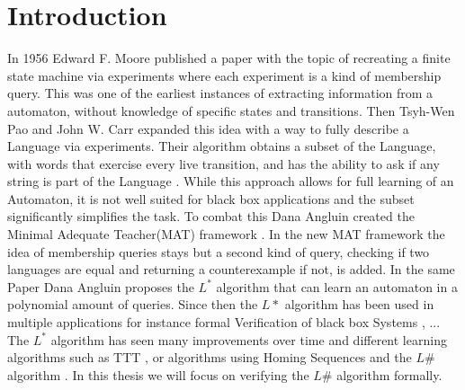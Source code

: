 \chapter{Introduction}
In 1956 Edward F. Moore published a paper with the topic of recreating a finite state machine via experiments\cite{gedankenexperiment} where each experiment is a kind of membership query. This was one of the earliest instances of extracting information from a automaton, without knowledge of specific states and transitions. Then Tsyh-Wen Pao and John W. Carr expanded this idea with a way to fully describe a Language via experiments. Their algorithm obtains a subset of the Language, with words that exercise every live transition, and has the ability to ask if any string is part of the Language \cite{PAO197853}. While this approach allows for full learning of an Automaton, it is not well suited for black box applications and the subset significantly simplifies the task. To combat this Dana Angluin created the Minimal Adequate Teacher(MAT) framework \cite{angluin}. In the new MAT framework the idea of membership queries stays but a second kind of query, checking if two languages are equal and returning a counterexample if not, is added. In the same Paper Dana Angluin proposes the $L^*$ algorithm that can learn an automaton in a polynomial amount of queries. Since then the $L*$ algorithm has been used in multiple applications for instance formal Verification of black box Systems \cite{Peled1999}, ... %
 The $L^*$ algorithm has seen many improvements over time \cite{} and different learning algorithms such as TTT \cite{10.1007/978-3-319-11164-3_26}, or algorithms using Homing Sequences \cite{RIVEST1993299} and the $L\#$ algorithm \cite{vandraagerlsharp}. In this thesis we will focus on verifying the $L\#$ algorithm formally. \\
